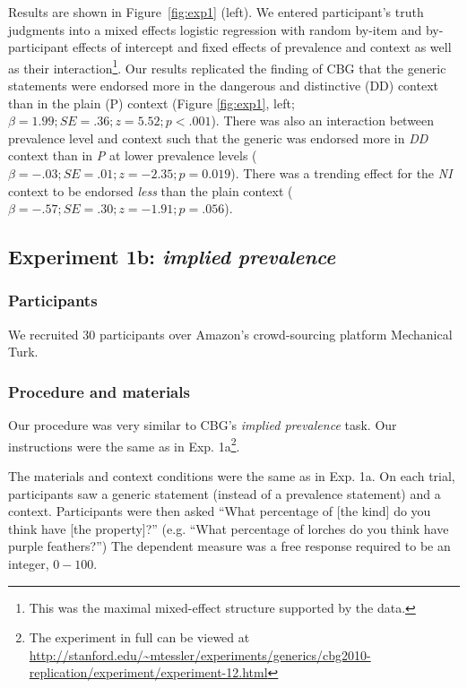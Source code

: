 \documentclass[10pt,letterpaper]{article}
\begin{document}
Results are shown in Figure~\ref{fig:exp1} (left). We entered participant's truth judgments into a mixed effects logistic regression with random by-item and by-participant effects of intercept and fixed effects of prevalence and context as well as their interaction\footnote{This was the maximal mixed-effect structure supported by the data.}.  
%
Our results replicated the finding of CBG that the generic statements were endorsed more in the dangerous and distinctive (DD) context than in the plain (P) context (Figure \ref{fig:exp1}, left; $\beta=1.99; SE = .36; z = 5.52; p < .001$). 
%
There was also an interaction between prevalence level and context such that the generic was endorsed more in \emph{DD} context than in \emph{P} at lower prevalence levels ($\beta=-.03; SE = .01; z=-2.35; p = 0.019$). There was a trending effect for the \emph{NI} context to be endorsed \emph{less} than the plain context ($\beta=-.57; SE = .30; z=-1.91; p = .056$).

\subsection{Experiment 1b: \emph{implied prevalence}}

\subsubsection{Participants}

We recruited 30 participants over Amazon's crowd-sourcing platform Mechanical Turk.  

\subsubsection{Procedure and materials}

Our procedure was very similar to CBG's \emph{implied prevalence} task. Our instructions were the same as in Exp. 1a\footnote{The experiment in full can be viewed at \url{http://stanford.edu/~mtessler/experiments/generics/cbg2010-replication/experiment/experiment-12.html}}. 

The materials and context conditions were the same as in Exp. 1a. 
On each trial, participants saw a generic statement (instead of a prevalence statement) and a context. 
Participants were then asked ``What percentage of [the kind] do you think have [the property]?'' (e.g. ``What percentage of lorches do you think have  purple feathers?'') The dependent measure was a free response required to be an integer, $0-100$. 
\end{document}
